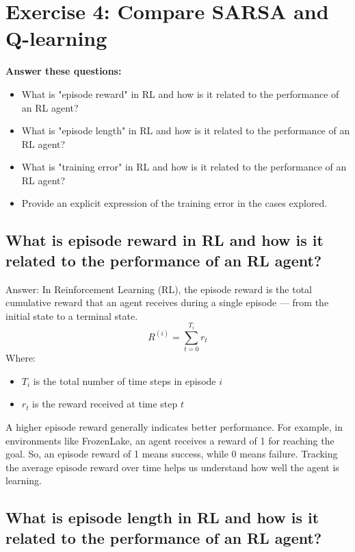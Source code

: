 \documentclass[11pt,a4paper]{article}
\begin{document}
\section{Exercise 4: Compare SARSA and Q-learning}

\textbf{Answer these questions:}
\begin{itemize}
    \item What is "episode reward" in RL and how is it related to the performance of an RL agent?
    \item What is "episode length" in RL and how is it related to the performance of an RL agent?
    \item What is "training error" in RL and how is it related to the performance of an RL agent?
    \item Provide an explicit expression of the training error in the cases explored.
\end{itemize}

\subsection{What is episode reward in RL and how is it related to the performance of an RL agent?}

Answer: In Reinforcement Learning (RL), the episode reward is the total cumulative reward that an agent receives during a single episode — from the initial state to a terminal state.
\begin{equation}
R^{(i)} = \sum_{t=0}^{T_i} r_t
\end{equation}
Where:
\begin{itemize}
    \item $T_i$ is the total number of time steps in episode $i$
    \item $r_t$ is the reward received at time step $t$
\end{itemize}
A higher episode reward generally indicates better performance. For example, in environments like FrozenLake, an agent receives a reward of 1 for reaching the goal. So, an episode reward of 1 means success, while 0 means failure. Tracking the average episode reward over time helps us understand how well the agent is learning.

\subsection{What is episode length in RL and how is it related to the performance of an RL agent?}
\end{document}
